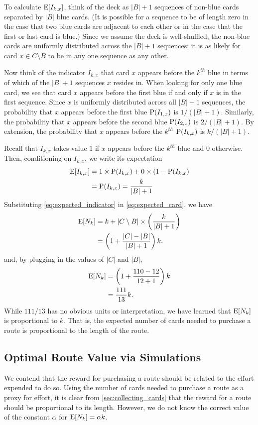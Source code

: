 To calculate $\operatorname{\mathrm{E}}[I_{k,x}]$, think of the deck as $|B| + 1$ sequences 
of non-blue cards separated by $|B|$ blue cards.
(It is possible for a sequence to be of length zero
in the case that two blue cards are adjacent to each other or
in the case that the first or last card is blue.)
Since we assume the deck is well-shuffled, the non-blue cards
are uniformly distributed across the $|B| + 1$ sequences:
it is as likely for card $x \in C \setminus B$ to be in any one sequence
as any other.

Now think of the indicator $I_{k,x}$ that card $x$ appears
before the $k^{th}$ blue in terms of which of the $|B| + 1$
sequences $x$ resides in.
When looking for only one blue card,
we see that card $x$ appears before the first blue if and only if
$x$ is in the first sequence.
Since $x$ is uniformly distributed across all $|B| + 1$ sequences,
the probability that $x$ appears before the first blue $\operatorname{\mathrm{P}}(I_{1,x})$
is $1/(|B| + 1)$.
Similarly, the probability that $x$ appears before the second blue
$\operatorname{\mathrm{P}}(I_{2,x})$ is $2/(|B| + 1)$.
By extension, the probability that $x$ appears before the $k^{th}$
$\operatorname{\mathrm{P}}(I_{k,x})$ is $k/(|B| + 1)$.

Recall that $I_{k,x}$ takes value 1 if $x$ appears before the 
$k^{th}$ blue and 0 otherwise.
Then, conditioning on $I_{k,x}$, we write its expectation
\begin{align} \label{eq:expected_indicator}
    \operatorname{\mathrm{E}}[I_{k,x}] &= 1 \times \operatorname{\mathrm{P}}(I_{k,x})
    + 0 \times (1-\operatorname{\mathrm{P}}(I_{k,x}) \nonumber \\
    &=\operatorname{\mathrm{P}}(I_{k,x}) = \frac{k}{|B| + 1}
\end{align}
Substituting \cref{eq:expected_indicator} in \cref{eq:expected_card},
we have
\begin{align}
    \operatorname{\mathrm{E}}[N_k] &= k + |C \setminus B| \times \left(\frac{k}{|B| + 1}\right)
    \nonumber \\
    &= \left(1 + \frac{|C| - |B|}{|B| + 1} \right)k. \nonumber
\end{align}
and, by plugging in the values of $|C|$ and $|B|$,
\begin{align}
    \operatorname{\mathrm{E}}[N_k] &= \left(1 + \frac{110 - 12}{12 + 1} \right)k \nonumber \\
    &= \frac{111}{13}k. \nonumber
\end{align}
While  $111/13$ has no obvious units or interpretation,
we have learned that $\operatorname{\mathrm{E}}[N_k]$ is proportional to $k$.
That is, the expected number of cards needed to
purchase a route is proportional to the length of the route.

\subsection{Optimal Route Value via Simulations}
We contend that the reward for purchasing a route 
should be related to the effort expended to do so.
Using the number of cards needed to purchase a route 
as a proxy for effort, it is clear from \cref{sec:collecting_cards}
that the reward for a route should be proportional to
its length.
However, we do not know the correct value of the constant $\alpha$
for $\operatorname{\mathrm{E}}[N_k] = \alpha k$.

